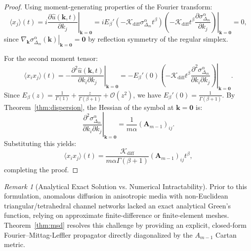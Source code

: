 \documentclass[11pt,a4paper]{article}
\theoremstyle{plain}
\theoremstyle{definition}
\theoremstyle{remark}
\newtheorem{remark}[theorem]{Remark}
\numberwithin{equation}{section}
\begin{document}
\begin{proof}
Using moment-generating properties of the Fourier transform:
\begin{equation}
\langle x_j \rangle(t) = \left. i \frac{\partial \widehat{u}(\mathbf{k}, t)}{\partial k_j} \right|_{\mathbf{k}=\mathbf{0}} = \left. i E_\beta'\left(-\mathcal{K}_{\text{diff}}\sigma_{\Delta_m}^\alpha t^\beta\right) \left(-\mathcal{K}_{\text{diff}} t^\beta \frac{\partial \sigma_{\Delta_m}^\alpha}{\partial k_j}\right) \right|_{\mathbf{k}=\mathbf{0}} = 0,
\end{equation}
since $\left.\nabla_\mathbf{k}\sigma_{\Delta_m}^\alpha(\mathbf{k})\right|_{\mathbf{k}=\mathbf{0}} = \mathbf{0}$ by reflection symmetry of the regular simplex.

For the second moment tensor:
\begin{equation}
\langle x_i x_j \rangle(t) = \left. -\frac{\partial^2 \widehat{u}(\mathbf{k}, t)}{\partial k_i \partial k_j} \right|_{\mathbf{k}=\mathbf{0}} = \left. -E_\beta'(0) \left(-\mathcal{K}_{\text{diff}} t^\beta \frac{\partial^2 \sigma_{\Delta_m}^\alpha}{\partial k_i \partial k_j}\right) \right|_{\mathbf{k}=\mathbf{0}}.
\end{equation}
Since $E_\beta(z) = \frac{1}{\Gamma(1)} + \frac{z}{\Gamma(\beta+1)} + \mathcal{O}(z^2)$, we have $E_\beta'(0) = \frac{1}{\Gamma(\beta+1)}$. By Theorem~\ref{thm:dispersion}, the Hessian of the symbol at $\mathbf{k}=\mathbf{0}$ is:
\begin{equation}
\left. \frac{\partial^2 \sigma_{\Delta_m}^\alpha}{\partial k_i \partial k_j} \right|_{\mathbf{k}=\mathbf{0}} = \frac{1}{m\alpha}(\mathbf{A}_{m-1})_{ij}.
\end{equation}
Substituting this yields:
\begin{equation}
\langle x_i x_j \rangle(t) = \frac{\mathcal{K}_{\text{diff}}}{m\alpha \Gamma(\beta+1)} (\mathbf{A}_{m-1})_{ij} t^\beta,
\end{equation}
completing the proof.
\end{proof}

\begin{remark}[Analytical Exact Solution vs. Numerical Intractability]
Prior to this formulation, anomalous diffusion in anisotropic media with non-Euclidean triangular/tetrahedral channel networks lacked an exact analytical Green's function, relying on approximate finite-difference or finite-element meshes. Theorem~\ref{thm:msd} resolves this challenge by providing an explicit, closed-form Fourier--Mittag-Leffler propagator directly diagonalized by the $A_{m-1}$ Cartan metric.
\end{remark}
\end{document}
